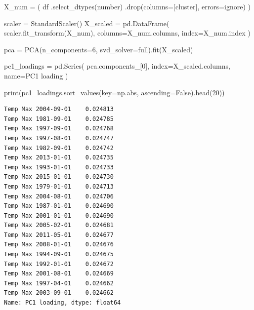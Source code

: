 \documentclass[
  letterpaper,
  DIV=11,
  numbers=noendperiod]{scrreprt}
\newenvironment{Shaded}{\begin{snugshade}}{\end{snugshade}}
\newcommand{\BuiltInTok}[1]{\textcolor[rgb]{0.00,0.23,0.31}{#1}}
\newcommand{\DecValTok}[1]{\textcolor[rgb]{0.68,0.00,0.00}{#1}}
\newcommand{\NormalTok}[1]{\textcolor[rgb]{0.00,0.23,0.31}{#1}}
\newcommand{\OperatorTok}[1]{\textcolor[rgb]{0.37,0.37,0.37}{#1}}
\newcommand{\StringTok}[1]{\textcolor[rgb]{0.13,0.47,0.30}{#1}}
\newcommand{\VariableTok}[1]{\textcolor[rgb]{0.07,0.07,0.07}{#1}}
\begin{document}
\begin{Shaded}
\begin{Highlighting}[]
\NormalTok{X\_num }\OperatorTok{=}\NormalTok{ (}
\NormalTok{    df }
\NormalTok{    .select\_dtypes(}\StringTok{\textquotesingle{}number\textquotesingle{}}\NormalTok{)}
\NormalTok{    .drop(columns}\OperatorTok{=}\NormalTok{[}\StringTok{\textquotesingle{}cluster\textquotesingle{}}\NormalTok{], errors}\OperatorTok{=}\StringTok{\textquotesingle{}ignore\textquotesingle{}}\NormalTok{)}
\NormalTok{)}

\NormalTok{scaler }\OperatorTok{=}\NormalTok{ StandardScaler()}
\NormalTok{X\_scaled }\OperatorTok{=}\NormalTok{ pd.DataFrame(}
\NormalTok{    scaler.fit\_transform(X\_num),}
\NormalTok{    columns}\OperatorTok{=}\NormalTok{X\_num.columns, }
\NormalTok{    index}\OperatorTok{=}\NormalTok{X\_num.index}
\NormalTok{)}

\NormalTok{pca }\OperatorTok{=}\NormalTok{ PCA(n\_components}\OperatorTok{=}\DecValTok{6}\NormalTok{, svd\_solver}\OperatorTok{=}\StringTok{\textquotesingle{}full\textquotesingle{}}\NormalTok{).fit(X\_scaled)}

\NormalTok{pc1\_loadings }\OperatorTok{=}\NormalTok{ pd.Series(}
\NormalTok{    pca.components\_[}\DecValTok{0}\NormalTok{],}
\NormalTok{    index}\OperatorTok{=}\NormalTok{X\_scaled.columns,}
\NormalTok{    name}\OperatorTok{=}\StringTok{\textquotesingle{}PC1 loading\textquotesingle{}}
\NormalTok{)}

\BuiltInTok{print}\NormalTok{(pc1\_loadings.sort\_values(key}\OperatorTok{=}\NormalTok{np.}\BuiltInTok{abs}\NormalTok{, ascending}\OperatorTok{=}\VariableTok{False}\NormalTok{).head(}\DecValTok{20}\NormalTok{))}
\end{Highlighting}
\end{Shaded}

\begin{verbatim}
Temp Max 2004-09-01    0.024813
Temp Max 1981-09-01    0.024785
Temp Max 1997-09-01    0.024768
Temp Max 1997-08-01    0.024747
Temp Max 1982-09-01    0.024742
Temp Max 2013-01-01    0.024735
Temp Max 1993-01-01    0.024733
Temp Max 2015-01-01    0.024730
Temp Max 1979-01-01    0.024713
Temp Max 2004-08-01    0.024706
Temp Max 1987-01-01    0.024690
Temp Max 2001-01-01    0.024690
Temp Max 2005-02-01    0.024681
Temp Max 2011-05-01    0.024677
Temp Max 2008-01-01    0.024676
Temp Max 1994-09-01    0.024675
Temp Max 1992-01-01    0.024672
Temp Max 2001-08-01    0.024669
Temp Max 1997-04-01    0.024662
Temp Max 2003-09-01    0.024662
Name: PC1 loading, dtype: float64
\end{verbatim}
\end{document}

